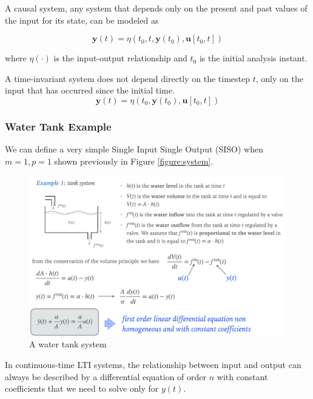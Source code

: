 \documentclass[11pt]{article}
\begin{document}
A causal system, any system that depends only on the present and past values of the input for its state, can be modeled as

\begin{equation}
  \textbf{y}(t) = \eta (t_0, t, \textbf{y}(t_0), \textbf{u}[t_0, t])
\end{equation}

where $\eta(\cdot)$ is the input-output relationship and $t_0$ is the initial analysis instant.

A time-invariant system does not depend directly on the timestep $t$, only on the input that has occurred since the initial time.
\begin{equation}
  \textbf{y}(t) = \eta (t_0, \textbf{y}(t_0), \textbf{u}[t_0, t])
\end{equation}

\subsubsection{Water Tank Example}

We can define a very simple Single Input Single Output (SISO) when $m=1, p=1$ shown previously in Figure \ref{figure:system}.

\begin{figure}[htbp]
  \centerline{\includegraphics[width=1\textwidth]{../../images/tank_system.png}}
  \caption{A water tank system}
  \label{fig:tank_system}
\end{figure}

In continuous-time LTI systems, the relationship between input and output can always be described by a differential equation of order $n$ with constant coefficients that we need to solve only for $y(t)$.
\end{document}
